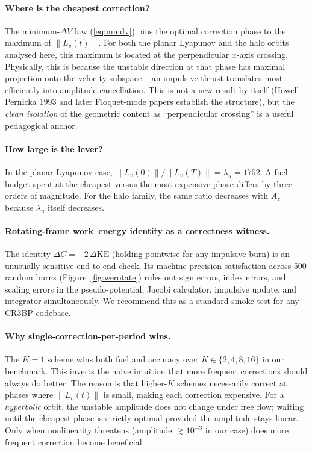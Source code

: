 \documentclass[11pt,a4paper]{article}
\begin{document}
\paragraph{Where is the cheapest correction?}
The minimum-$\Delta V$ law (\ref{eq:mindv}) pins the optimal correction phase to the maximum of $\|L_v(t)\|$. For both the planar Lyapunov and the halo orbits analysed here, this maximum is located at the perpendicular $x$-axis crossing. Physically, this is because the unstable direction at that phase has maximal projection onto the velocity subspace -- an impulsive thrust translates most efficiently into amplitude cancellation. This is not a new result by itself (Howell--Pernicka 1993 and later Floquet-mode papers establish the structure), but the \emph{clean isolation} of the geometric content as ``perpendicular crossing'' is a useful pedagogical anchor.

\paragraph{How large is the lever?}
In the planar Lyapunov case, $\|L_v(0)\|/\|L_v(T)\| = \lambda_u = 1752$. A fuel budget spent at the cheapest versus the most expensive phase differs by three orders of magnitude. For the halo family, the same ratio decreases with $A_z$ because $\lambda_u$ itself decreases.

\paragraph{Rotating-frame work--energy identity as a correctness witness.}
The identity $\Delta C = -2\,\Delta \mathrm{KE}$ (holding pointwise for any impulsive burn) is an unusually sensitive end-to-end check. Its machine-precision satisfaction across 500 random burns (Figure~\ref{fig:werotate}) rules out sign errors, index errors, and scaling errors in the pseudo-potential, Jacobi calculator, impulsive update, and integrator simultaneously. We recommend this as a standard smoke test for any CR3BP codebase.

\paragraph{Why single-correction-per-period wins.}
The $K=1$ scheme wins both fuel and accuracy over $K \in \{2,4,8,16\}$ in our benchmark. This inverts the naive intuition that more frequent corrections should always do better. The reason is that higher-$K$ schemes necessarily correct at phases where $\|L_v(t)\|$ is small, making each correction expensive. For a \emph{hyperbolic} orbit, the unstable amplitude does not change under free flow; waiting until the cheapest phase is strictly optimal provided the amplitude stays linear. Only when nonlinearity threatens (amplitude $\gtrsim 10^{-3}$ in our case) does more frequent correction become beneficial.
\end{document}
